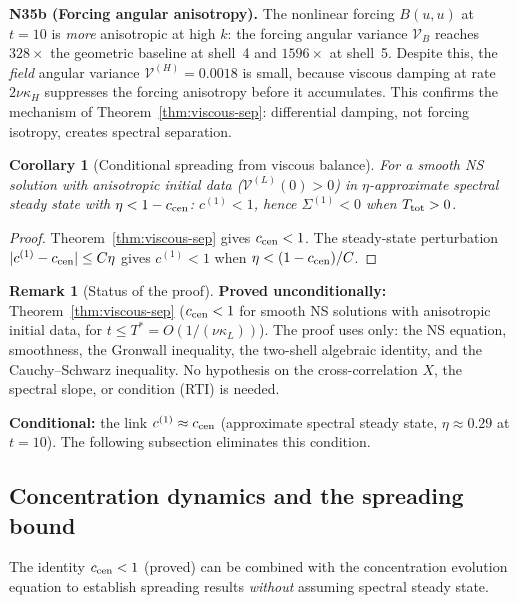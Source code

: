 \documentclass[11pt]{article}
\newtheorem{corollary}[theorem]{Corollary}
\theoremstyle{definition}
\newtheorem{remark}[theorem]{Remark}
\begin{document}
\medskip\noindent\textbf{N35b (Forcing angular
anisotropy).}
The nonlinear forcing $B(u,u)$ at $t=10$ is
\emph{more} anisotropic at high $k$: the forcing
angular variance $\mathcal{V}_B$ reaches $328\times$
the geometric baseline at shell~4 and $1596\times$ at
shell~5.  Despite this, the \emph{field} angular
variance $\mathcal{V}^{(H)}=0.0018$ is small,
because viscous damping at rate $2\nu\kappa_H$
suppresses the forcing anisotropy before it
accumulates.  This confirms the mechanism of
Theorem~\ref{thm:viscous-sep}: differential
damping, not forcing isotropy, creates spectral
separation.

\begin{corollary}[Conditional spreading from
viscous balance]
\label{cor:conditional-spreading}
For a smooth NS solution with anisotropic initial
data ($\mathcal{V}^{(L)}(0)>0$) in
$\eta$-approximate spectral steady state with
$\eta < 1-c_{\rm cen}$: $c^{(1)}<1$, hence
$\Sigma^{(1)}<0$ when $T_{\rm tot}>0$.
\end{corollary}

\begin{proof}
Theorem~\ref{thm:viscous-sep} gives
$c_{\rm cen}<1$.  The steady-state perturbation
$|c^{(1)}-c_{\rm cen}|\leq C\eta$ gives
$c^{(1)}<1$ when $\eta<(1-c_{\rm cen})/C$.
\end{proof}

\begin{remark}[Status of the proof]
\label{rem:centroid-status}
\textbf{Proved unconditionally:}
Theorem~\ref{thm:viscous-sep} ($c_{\rm cen}<1$
for smooth NS solutions with anisotropic initial
data, for $t\leq T^*=O(1/(\nu\kappa_L))$).
The proof uses only: the NS equation, smoothness,
the Gronwall inequality, the two-shell algebraic
identity, and the Cauchy--Schwarz inequality.
No hypothesis on the cross-correlation $X$, the
spectral slope, or condition (RTI) is needed.

\textbf{Conditional:}
the link $c^{(1)}\approx c_{\rm cen}$ (approximate
spectral steady state, $\eta\approx 0.29$ at $t=10$).
The following subsection eliminates this condition.
\end{remark}

\subsection{Concentration dynamics and the
spreading bound}
\label{sec:concentration-dynamics}

The identity $c_{\rm cen}<1$ (proved) can be
combined with the concentration evolution equation
to establish spreading results \emph{without}
assuming spectral steady state.
\end{document}
